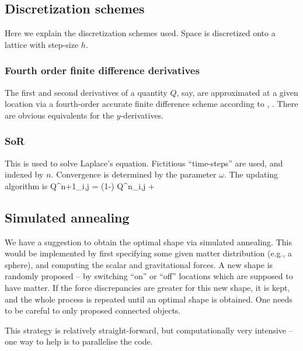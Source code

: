 \documentclass[a4paper, 12pt]{article}
\numberwithin{equation}{section}
\begin{document}
\subsection{Discretization schemes}
Here we explain the discretization schemes used. Space is discretized onto a lattice with step-size $h$.

\subsubsection{Fourth order finite difference derivatives}
The first and second derivatives of a quantity $Q$, say, are approximated at a given location via a fourth-order accurate finite difference scheme according to
\bea
{} \approx {},
\eea
\bea
{} \approx {}.
\eea
There are obvious equivalents for the $y$-derivatives.

\subsubsection{SoR} 
This is used to solve Laplace's equation. Fictitious ``time-steps'' are used, and indexed by $n$. Convergence is determined by the parameter $\omega$. The updating algorithm is
\bea
Q^{n+1}_{i,j} = (1-\omega) Q^{n}_{i,j} + 
\eea

\subsection{Simulated annealing}
We have a suggestion to obtain the optimal shape via simulated annealing. This would be implemented by first specifying some given matter distribution (e.g., a sphere), and computing the scalar and gravitational forces. A new shape is randomly proposed -- by switching ``on'' or ``off'' locations which are supposed to have matter. If the force discrepancies are greater for this new shape, it is kept, and the whole process is repeated until an optimal shape is obtained. One needs to be careful to only proposed connected objects.

This strategy is relatively straight-forward, but computationally very intensive -- one way to help is to parallelise the code.

\footnotesize{

}
\end{document}
